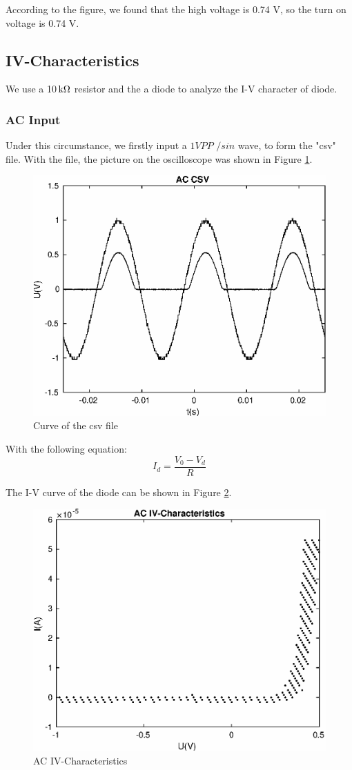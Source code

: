 \documentclass{article}
\newcommand{\unit}[1]{{\rm\,#1}}
\begin{document}
According to the figure, we found that the high voltage is 0.74 V, so the turn on voltage is 0.74 V.

\newpage
\subsection{IV-Characteristics}

We use a 10$\unit{k\Omega}$ resistor and the a diode to analyze the I-V character of diode. 

\subsubsection{AC Input}
Under this circumstance, we firstly input a $1VPP$ $/sin$ wave, to form the "csv" file. With the file, the picture on the oscilloscope was shown in Figure \ref{fig-2-1}.

\begin{figure}[!htbp]
	\centering
	\includegraphics[width=0.7\linewidth]{imgs/ac-csv.eps}
	\caption{Curve of the csv file}
	\label{fig-2-1}
\end{figure}

With the following equation:
$$I_d=\frac{V_0-V_d}{R}$$

The I-V curve of the diode can be shown in Figure \ref{fig-2-2}.

\begin{figure}[!htbp]
	\centering
	\includegraphics[width=0.7\linewidth]{imgs/ac-iv.eps}
	\caption{AC IV-Characteristics}
	\label{fig-2-2}
\end{figure}
\end{document}
